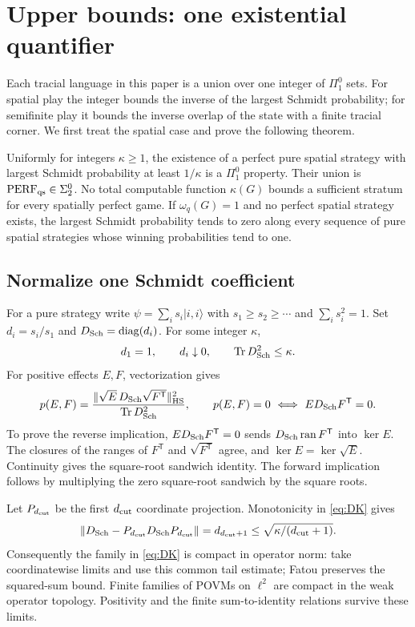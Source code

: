 \section{Upper bounds: one existential quantifier}\label{sec:upper}
Each tracial language in this paper is a union over one integer of $\Pi^0_1$ sets. For spatial play the integer bounds the inverse of the largest Schmidt probability; for semifinite play it bounds the inverse overlap of the state with a finite tracial corner. We first treat the spatial case and prove the following theorem.

\begin{theorem}\label{thm:strata}
Uniformly for integers $\kappa\geq1$, the existence of a perfect pure spatial strategy with largest Schmidt probability at least $1/\kappa$ is a $\Pi^0_1$ property. Their union is $\mathrm{PERF}_{\mathrm{qs}}\in\Sigma^0_2$. No total computable function $\kappa(G)$ bounds a sufficient stratum for every spatially perfect game. If $\omega_q(G)=1$ and no perfect spatial strategy exists, the largest Schmidt probability tends to zero along every sequence of pure spatial strategies whose winning probabilities tend to one.
\end{theorem}

\subsection{Normalize one Schmidt coefficient}
For a pure strategy write $\psi=\sum_i s_i|i,i\rangle$ with $s_1\geq s_2\geq\cdots$ and $\sum_i s_i^2=1$. Set $d_i=s_i/s_1$ and $D_{\rm Sch}=\operatorname{diag}(d_i)$. For some integer $\kappa$,
\begin{equation}\label{eq:DK}
 d_1=1,\qquad d_i\downarrow0,\qquad \operatorname{Tr} D_{\rm Sch}^2\leq \kappa.
\end{equation}
For positive effects $E,F$, vectorization gives
\[
 p(E,F)=\frac{\|\sqrt E\,D_{\rm Sch}\sqrt{F^{\mathsf T}}\|_{\rm HS}^2}{\operatorname{Tr} D_{\rm Sch}^2},
 \qquad p(E,F)=0\ \Longleftrightarrow\ ED_{\rm Sch}F^{\mathsf T}=0.
\]
To prove the reverse implication, $ED_{\rm Sch}F^{\mathsf T}=0$ sends $D_{\rm Sch}\operatorname{ran} F^{\mathsf T}$ into $\ker E$. The closures of the ranges of $F^{\mathsf T}$ and $\sqrt{F^{\mathsf T}}$ agree, and $\ker E=\ker\sqrt E$. Continuity gives the square-root sandwich identity. The forward implication follows by multiplying the zero square-root sandwich by the square roots.

Let $P_{d_{\rm cut}}$ be the first ${d_{\rm cut}}$ coordinate projection. Monotonicity in \eqref{eq:DK} gives
\begin{equation}\label{eq:tail}
 \|D_{\rm Sch}-P_{d_{\rm cut}}D_{\rm Sch}P_{d_{\rm cut}}\|=d_{{d_{\rm cut}}+1}\leq\sqrt{\kappa/({d_{\rm cut}}+1)}.
\end{equation}
Consequently the family in \eqref{eq:DK} is compact in operator norm: take coordinatewise limits and use this common tail estimate; Fatou preserves the squared-sum bound. Finite families of POVMs on $\ell^2$ are compact in the weak operator topology. Positivity and the finite sum-to-identity relations survive these limits.


